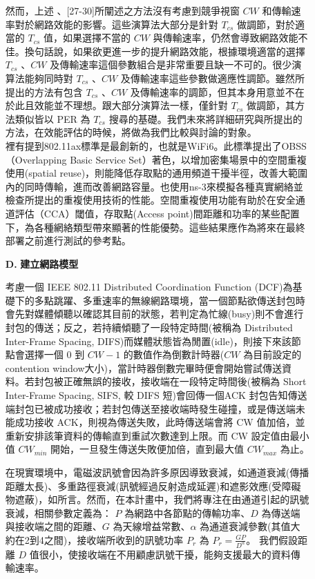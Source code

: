 \documentclass[12pt,a4paper]{article}
\begin{document}
\begin{description}
\begin{enumerate}
然而，上述\cite{cccn08_phycs} 、[27-30]所闡述之方法沒有考慮到競爭視窗 $CW$ 和傳輸速率對於網路效能的影響。這些演算法大部分是針對 $T_{cs}$ 做調節，對於適當的 $T_{cs}$ 值，如果選擇不當的 $CW$ 與傳輸速率，仍然會導致網路效能不佳。換句話說，如果欲更進一步的提升網路效能，根據環境適當的選擇 $T_{cs}$ 、$CW$ 及傳輸速率這個參數組合是非常重要且缺一不可的。很少演算法能夠同時對 $T_{cs}$ 、$CW$ 及傳輸速率這些參數做適應性調節。雖然\cite{ton09_optwmn}所提出的方法有包含 $T_{cs}$ 、$CW$ 及傳輸速率的調節，但其本身用意並不在於此且效能並不理想。\cite{tmc09_aphycs}跟大部分演算法一樣，僅針對 $T_{cs}$ 做調節，其方法類似\cite{ton09_optwmn}皆以 PER 為 $T_{cs}$ 搜尋的基礎。我們未來將詳細研究\cite{tmc09_aphycs}與\cite{ton09_optwmn}所提出的方法，在效能評估的時候，將做為我們比較與討論的對象。 \\

\cite{32}裡有提到802.11ax標準是最創新的，也就是WiFi6。此標準提出了OBSS（Overlapping Basic Service Set）著色，以增加密集場景中的空間重複使用(spatial reuse)，則能降低存取點的通用頻道干擾半徑，改善大範圍內的同時傳輸，進而改善網路容量。也使用ns-3來模擬各種真實網絡並檢查所提出的重複使用技術的性能。空間重複使用功能有助於在安全通道評估（CCA）閾值，存取點(Access point)間距離和功率的某些配置下，為各種網絡類型帶來顯著的性能優勢。這些結果應作為將來在最終部署之前進行測試的參考點。

\item [\bf D.]{\textbf{\Kai 建立網路模型 }}\\
\vspace{-2mm}

考慮一個 IEEE 802.11 Distributed Coordination Function (DCF)為基礎下的多點跳躍、多重速率的無線網路環境，當一個節點欲傳送封包時會先對媒體傾聽以確認其目前的狀態，若判定為忙線(busy)則不會進行封包的傳送；反之，若持續傾聽了一段特定時間(被稱為 Distributed Inter-Frame Spacing, DIFS)而媒體狀態皆為閒置(idle)，則接下來該節點會選擇一個 $0$ 到 $CW-1$ 的數值作為倒數計時器($CW$ 為目前設定的 contention window大小)，當計時器倒數完畢時便會開始嘗試傳送資料。若封包被正確無誤的接收，接收端在一段特定時間後(被稱為 Short Inter-Frame Spacing, SIFS, 較 DIFS 短)會回傳一個ACK 封包告知傳送端封包已被成功接收；若封包傳送至接收端時發生碰撞，或是傳送端未能成功接收 ACK，則視為傳送失敗，此時傳送端會將 CW 值加倍，並重新安排該筆資料的傳輸直到重試次數達到上限。而 CW 設定值由最小值 $CW_{min}$ 開始，一旦發生傳送失敗便加倍，直到最大值 $CW_{max}$ 為止。 

在現實環境中，電磁波訊號會因為許多原因導致衰減，如通道衰減(傳播距離太長)、多重路徑衰減(訊號經過反射造成延遲)和遮影效應(受障礙物遮蔽)，如\cite{book2002_wc}所言。然而，在本計畫中，我們將專注在由通道引起的訊號衰減，相關參數定義為： $P$ 為網路中各節點的傳輸功率、$D$ 為傳送端與接收端之間的距離、$G$ 為天線增益常數、$\alpha$ 為通道衰減參數(其值大約在2到4之間)，接收端所收到的訊號功率 $P_r$ 為 $P_r = \frac{GP}{D^ \alpha}$。 我們假設距離 $D$ 值很小，使接收端在不用顧慮訊號干擾，能夠支援最大的資料傳輸速率。 


\end{enumerate}
\end{description}
\end{document}
